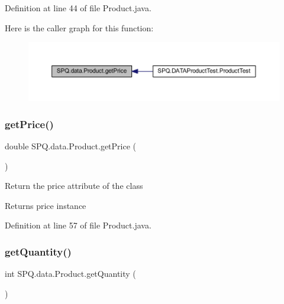 Definition at line 44 of file Product.\+java.

Here is the caller graph for this function\+:\nopagebreak
\begin{figure}[H]
\begin{center}
\leavevmode
\includegraphics[width=350pt]{class_s_p_q_1_1data_1_1_product_ad8200addd74d2e3b6ea9cfff4e8b8c7e_icgraph}
\end{center}
\end{figure}
\mbox{\label{class_s_p_q_1_1data_1_1_product_ad8200addd74d2e3b6ea9cfff4e8b8c7e}} 
\subsubsection{\texorpdfstring{get\+Price()}{getPrice()}\hspace{0.1cm}{\footnotesize\ttfamily [2/2]}}
{\footnotesize\ttfamily double S\+P\+Q.\+data.\+Product.\+get\+Price (\begin{DoxyParamCaption}{ }\end{DoxyParamCaption})}

Return the price attribute of the class \begin{DoxyReturn}{Returns}
price instance 
\end{DoxyReturn}


Definition at line 57 of file Product.\+java.

\mbox{\label{class_s_p_q_1_1data_1_1_product_a1bcbc2a00b31563677cea1ab4cb8095c}} 
\subsubsection{\texorpdfstring{get\+Quantity()}{getQuantity()}}
{\footnotesize\ttfamily int S\+P\+Q.\+data.\+Product.\+get\+Quantity (\begin{DoxyParamCaption}{ }\end{DoxyParamCaption})}

